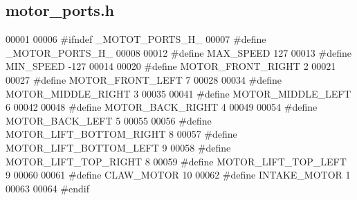 \subsection{motor\+\_\+ports.\+h}
\label{motor__ports_8h_source}

\begin{DoxyCode}
00001 
00006 \textcolor{preprocessor}{#ifndef \_MOTOT\_PORTS\_H\_}
00007 \textcolor{preprocessor}{#define \_MOTOR\_PORTS\_H\_}
00008 
00012 \textcolor{preprocessor}{#define MAX\_SPEED 127}
00013 \textcolor{preprocessor}{#define MIN\_SPEED -127}
00014 
00020 \textcolor{preprocessor}{#define MOTOR\_FRONT\_RIGHT 2}
00021 
00027 \textcolor{preprocessor}{#define MOTOR\_FRONT\_LEFT 7}
00028 
00034 \textcolor{preprocessor}{#define MOTOR\_MIDDLE\_RIGHT 3}
00035 
00041 \textcolor{preprocessor}{#define MOTOR\_MIDDLE\_LEFT 6}
00042 
00048 \textcolor{preprocessor}{#define MOTOR\_BACK\_RIGHT 4}
00049 
00054 \textcolor{preprocessor}{#define MOTOR\_BACK\_LEFT 5}
00055 
00056 \textcolor{preprocessor}{#define MOTOR\_LIFT\_BOTTOM\_RIGHT 8}
00057 \textcolor{preprocessor}{#define MOTOR\_LIFT\_BOTTOM\_LEFT 9}
00058 \textcolor{preprocessor}{#define MOTOR\_LIFT\_TOP\_RIGHT 8}
00059 \textcolor{preprocessor}{#define MOTOR\_LIFT\_TOP\_LEFT 9}
00060 
00061 \textcolor{preprocessor}{#define CLAW\_MOTOR 10}
00062 \textcolor{preprocessor}{#define INTAKE\_MOTOR 1}
00063 
00064 \textcolor{preprocessor}{#endif}
\end{DoxyCode}

